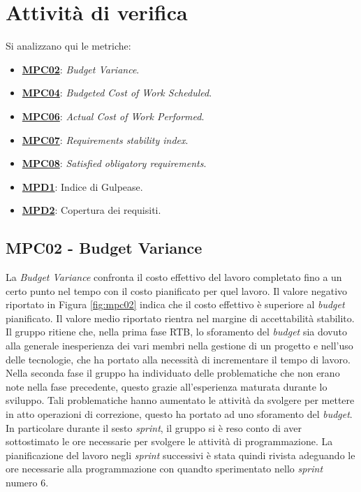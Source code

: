 \section{Attività di verifica}
Si analizzano qui le metriche:
\begin{itemize}
    \item \hyperref[s:mpc02]{\textbf{MPC02}}\textbf{}: \textit{Budget Variance}.
    \item \hyperref[s:mpc04]{\textbf{MPC04}}\textbf{}: \textit{Budgeted Cost of Work Scheduled}.
    \item \hyperref[s:mpc06]{\textbf{MPC06}}\textbf{}: \textit{Actual Cost of Work Performed}.
    \item \hyperref[s:mpc07]{\textbf{MPC07}}\textbf{}: \textit{Requirements stability index}.
    \item \hyperref[s:mpc08]{\textbf{MPC08}}\textbf{}: \textit{Satisfied obligatory requirements}.
    \item \hyperref[s:mpd1]{\textbf{MPD1}}\textbf{}: Indice di Gulpease.
    \item \hyperref[s:mpd1]{\textbf{MPD2}}\textbf{}: Copertura dei requisiti.
\end{itemize}

\subsection{MPC02 - Budget Variance}
\label{s:mpc02}
La \textit{Budget Variance} confronta il costo effettivo del lavoro completato fino a un certo punto nel tempo con il costo pianificato per quel lavoro.
Il valore negativo riportato in Figura \ref{fig:mpc02} indica che il costo effettivo è superiore al \textit{budget} pianificato.
Il valore medio riportato rientra nel margine di accettabilità stabilito. \\
Il gruppo ritiene che, nella prima fase RTB, lo sforamento del \textit{budget} sia dovuto alla generale inesperienza dei vari membri nella gestione di un progetto e nell'uso delle tecnologie, che ha portato alla necessità di incrementare il tempo di lavoro.\\
Nella seconda fase il gruppo ha individuato delle problematiche che non erano note nella fase precedente, questo grazie all'esperienza maturata durante lo sviluppo.
Tali problematiche hanno aumentato le attività da svolgere per mettere in atto operazioni di correzione, questo ha portato ad uno sforamento del \textit{budget}.
In particolare durante il sesto \textit{sprint}, il gruppo si è reso conto di aver sottostimato le ore necessarie per svolgere le attività di programmazione.
La pianificazione del lavoro negli \textit{sprint} successivi è stata quindi rivista adeguando le ore necessarie alla programmazione con quandto sperimentato nello \textit{sprint} numero 6.

